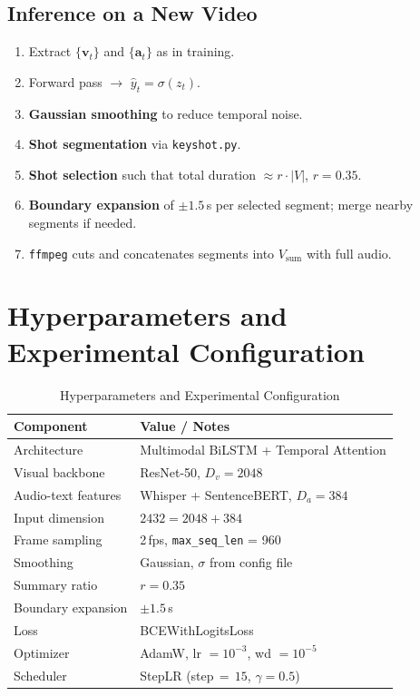 \documentclass[10pt,conference]{IEEEtran}
\begin{document}
\subsection{Inference on a New Video}

\begin{enumerate}
  \item Extract $\{\mathbf{v}_t\}$ and $\{\mathbf{a}_t\}$ as in training.
  \item Forward pass $\to$ $\hat{y}_t = \sigma(z_t)$.
  \item \textbf{Gaussian smoothing} to reduce temporal noise.
  \item \textbf{Shot segmentation} via \texttt{keyshot.py}.
  \item \textbf{Shot selection} such that total duration $\approx r \cdot
        |V|$, $r = 0.35$.
  \item \textbf{Boundary expansion} of $\pm 1.5$\,s per selected segment;
        merge nearby segments if needed.
  \item \texttt{ffmpeg} cuts and concatenates segments into
        $V_{\mathrm{sum}}$ with full audio.
\end{enumerate}

\section{Hyperparameters and Experimental Configuration}

\begin{table}[h]
\centering
\caption{Hyperparameters and Experimental Configuration}
\label{tab:hyperparams}
\begin{tabular}{ll}
\toprule
\textbf{Component} & \textbf{Value / Notes} \\
\midrule
Architecture         & Multimodal BiLSTM + Temporal Attention \\
Visual backbone      & ResNet-50, $D_v = 2048$ \\
Audio-text features  & Whisper + SentenceBERT, $D_a = 384$ \\
Input dimension      & $2432 = 2048 + 384$ \\
Frame sampling       & 2\,fps, \texttt{max\_seq\_len} = 960 \\
Smoothing            & Gaussian, $\sigma$ from config file \\
Summary ratio        & $r = 0.35$ \\
Boundary expansion   & $\pm 1.5$\,s \\
Loss                 & BCEWithLogitsLoss \\
Optimizer            & AdamW, lr $= 10^{-3}$, wd $= 10^{-5}$ \\
Scheduler            & StepLR (step$\,{=}\,15$, $\gamma{=}0.5$) \\
\bottomrule
\end{tabular}
\end{table}
\end{document}
